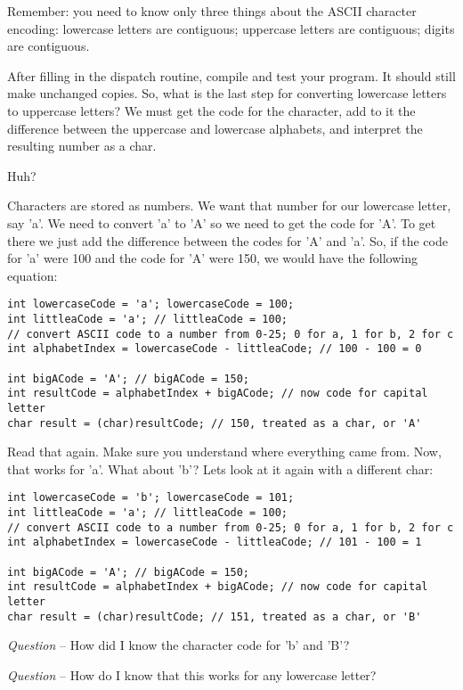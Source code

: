 \documentclass[12pt,oneside]{memoir}
\newenvironment{LabExercises}{%
\renewcommand{\ExerciseListName}{Question}%
\renewcommand{\ExerciseListHeader}{\textbf{%
   Phase\ExerciseHeaderNB. }}
\begin{ExerciseList}}%
{\end{ExerciseList}}
\newcounter{myQuestion}
\newcommand{\myQuestion}{\addtocounter{myQuestion}{1}\emph{Question \themyQuestion}-- }
\begin{document}
\begin{LabExercises}
  Remember: you need to know only three things about the ASCII
  character encoding: lowercase letters are contiguous; uppercase
  letters are contiguous; digits are contiguous.

  After filling in the dispatch routine, compile and test your
  program. It should still make unchanged copies. So, what is the last
  step for converting lowercase letters to uppercase letters? We must
  get the code for the character, add to it the difference between the
  uppercase and lowercase alphabets, and interpret the resulting
  number as a char.

  Huh?

  Characters are stored as numbers. We want that number for our
  lowercase letter, say 'a'. We need to convert 'a' to 'A' so we need
  to get the code for 'A'. To get there we just add the difference
  between the codes for 'A' and 'a'. So, if the code for 'a' were 100 and
  the code for 'A' were 150, we would have the following equation:

  \begin{lstlisting}
int lowercaseCode = 'a'; lowercaseCode = 100;
int littleaCode = 'a'; // littleaCode = 100;
// convert ASCII code to a number from 0-25; 0 for a, 1 for b, 2 for c
int alphabetIndex = lowercaseCode - littleaCode; // 100 - 100 = 0

int bigACode = 'A'; // bigACode = 150;
int resultCode = alphabetIndex + bigACode; // now code for capital letter
char result = (char)resultCode; // 150, treated as a char, or 'A'    
  \end{lstlisting}

  Read that again. Make sure you understand where everything came
  from. Now, that works for 'a'. What about 'b'? Lets look at it again
  with a different char:

  \begin{lstlisting}
int lowercaseCode = 'b'; lowercaseCode = 101;
int littleaCode = 'a'; // littleaCode = 100;
// convert ASCII code to a number from 0-25; 0 for a, 1 for b, 2 for c
int alphabetIndex = lowercaseCode - littleaCode; // 101 - 100 = 1

int bigACode = 'A'; // bigACode = 150;
int resultCode = alphabetIndex + bigACode; // now code for capital letter
char result = (char)resultCode; // 151, treated as a char, or 'B'    
  \end{lstlisting}

  \myQuestion How did I know the character code for 'b' and 'B'?

  \myQuestion How do I know that this works for any lowercase letter?


\end{LabExercises}
\end{document}
